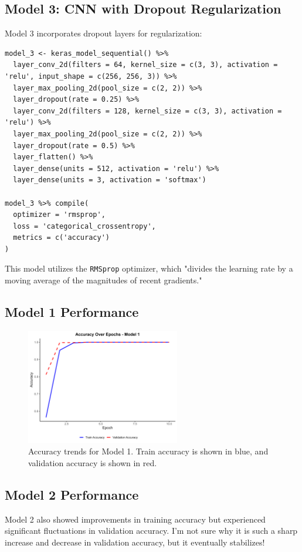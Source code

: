 \documentclass{article}
\begin{document}
\subsection{Model 3: CNN with Dropout Regularization}
Model 3 incorporates dropout layers for regularization:

\begin{verbatim}
model_3 <- keras_model_sequential() %>%
  layer_conv_2d(filters = 64, kernel_size = c(3, 3), activation = 'relu', input_shape = c(256, 256, 3)) %>%
  layer_max_pooling_2d(pool_size = c(2, 2)) %>%
  layer_dropout(rate = 0.25) %>%
  layer_conv_2d(filters = 128, kernel_size = c(3, 3), activation = 'relu') %>%
  layer_max_pooling_2d(pool_size = c(2, 2)) %>%
  layer_dropout(rate = 0.5) %>%
  layer_flatten() %>%
  layer_dense(units = 512, activation = 'relu') %>%
  layer_dense(units = 3, activation = 'softmax')

model_3 %>% compile(
  optimizer = 'rmsprop',
  loss = 'categorical_crossentropy',
  metrics = c('accuracy')
)
\end{verbatim}

This model utilizes the \texttt{RMSprop} optimizer, which "divides the learning rate by a moving average of the magnitudes of recent gradients."



\subsection{Model 1 Performance}

\begin{figure}[h!]
    \centering
    \includegraphics[width=0.6\textwidth]{../results/accuracy_plot_model_1.png}
    \caption{Accuracy trends for Model 1. Train accuracy is shown in blue, and validation accuracy is shown in red.}
    \label{fig:model1}
\end{figure}

\subsection{Model 2 Performance}
Model 2 also showed improvements in training accuracy but experienced significant fluctuations in validation accuracy. I'm not sure why it is such a sharp increase and decrease in validation accuracy, but it eventually stabilizes!
\end{document}
